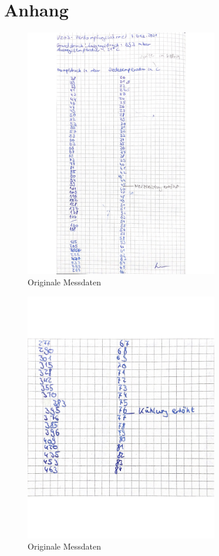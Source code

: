 \newpage
\section{Anhang}
\label{sec:Anhang}

\begin{figure}
    \centering
    \includegraphics[width=0.75\textwidth]{daten/daten1.jpg}
    \caption{Originale Messdaten}
    \label{fig:daten1}
\end{figure}

\begin{figure}
    \centering
    \includegraphics[width=0.75\textwidth]{daten/daten2.jpg}
    \caption{Originale Messdaten}
    \label{fig:daten2}
\end{figure}

